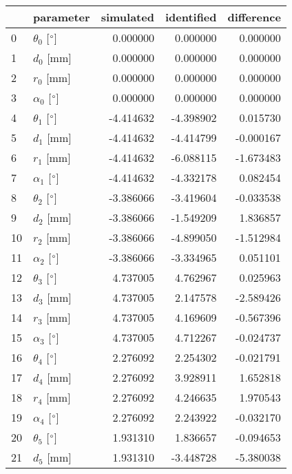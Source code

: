 \documentclass{standalone}%
\begin{document}
%
\normalsize%
\begin{tabular}{llrrr}
\toprule
{} &                 parameter & simulated & identified & difference \\
\midrule
0  &  $\theta_{0}$ [$\degree$] &  0.000000 &   0.000000 &   0.000000 \\
1  &              $d_{0}$ [mm] &  0.000000 &   0.000000 &   0.000000 \\
2  &              $r_{0}$ [mm] &  0.000000 &   0.000000 &   0.000000 \\
3  &  $\alpha_{0}$ [$\degree$] &  0.000000 &   0.000000 &   0.000000 \\
4  &  $\theta_{1}$ [$\degree$] & -4.414632 &  -4.398902 &   0.015730 \\
5  &              $d_{1}$ [mm] & -4.414632 &  -4.414799 &  -0.000167 \\
6  &              $r_{1}$ [mm] & -4.414632 &  -6.088115 &  -1.673483 \\
7  &  $\alpha_{1}$ [$\degree$] & -4.414632 &  -4.332178 &   0.082454 \\
8  &  $\theta_{2}$ [$\degree$] & -3.386066 &  -3.419604 &  -0.033538 \\
9  &              $d_{2}$ [mm] & -3.386066 &  -1.549209 &   1.836857 \\
10 &              $r_{2}$ [mm] & -3.386066 &  -4.899050 &  -1.512984 \\
11 &  $\alpha_{2}$ [$\degree$] & -3.386066 &  -3.334965 &   0.051101 \\
12 &  $\theta_{3}$ [$\degree$] &  4.737005 &   4.762967 &   0.025963 \\
13 &              $d_{3}$ [mm] &  4.737005 &   2.147578 &  -2.589426 \\
14 &              $r_{3}$ [mm] &  4.737005 &   4.169609 &  -0.567396 \\
15 &  $\alpha_{3}$ [$\degree$] &  4.737005 &   4.712267 &  -0.024737 \\
16 &  $\theta_{4}$ [$\degree$] &  2.276092 &   2.254302 &  -0.021791 \\
17 &              $d_{4}$ [mm] &  2.276092 &   3.928911 &   1.652818 \\
18 &              $r_{4}$ [mm] &  2.276092 &   4.246635 &   1.970543 \\
19 &  $\alpha_{4}$ [$\degree$] &  2.276092 &   2.243922 &  -0.032170 \\
20 &  $\theta_{5}$ [$\degree$] &  1.931310 &   1.836657 &  -0.094653 \\
21 &              $d_{5}$ [mm] &  1.931310 &  -3.448728 &  -5.380038 \\

\end{tabular}
\end{document}
